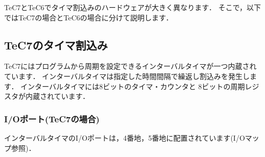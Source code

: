 TeC7とTeC6でタイマ割込みのハードウェアが大きく異なります．
そこで，以下ではTeC7の場合とTeC6の場合に分けて説明します．
\subsection{TeC7のタイマ割込み}

TeC7にはプログラムから周期を設定できるインターバルタイマが一つ内蔵されています．
インターバルタイマは指定した時間間隔で繰返し割込みを発生します．
インターバルタイマには8ビットのタイマ・カウンタと
8ビットの周期レジスタが内蔵されています．

\subsubsection{I/Oポート(TeC7の場合)}
インターバルタイマのI/Oポートは，4番地，5番地に配置されています(I/Oマップ参照)．


